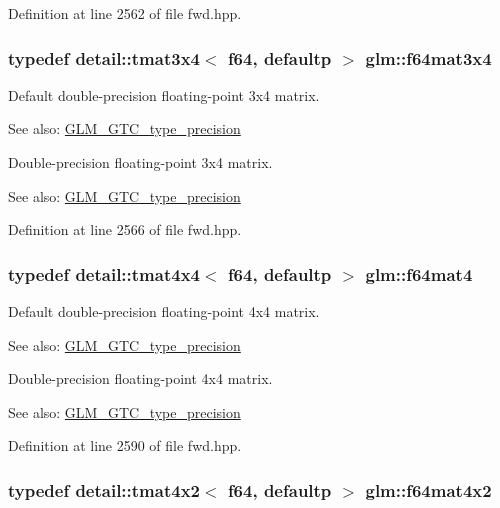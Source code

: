 Definition at line 2562 of file fwd.hpp.\hypertarget{group__gtc__type__precision_gc9468e5fa519d06b452d3126bb22a597}{
\subsubsection[f64mat3x4]{\setlength{\rightskip}{0pt plus 5cm}typedef detail::tmat3x4$<$ f64, defaultp $>$ {\bf glm::f64mat3x4}}}
\label{group__gtc__type__precision_gc9468e5fa519d06b452d3126bb22a597}


Default double-precision floating-point 3x4 matrix. \begin{Desc}
\item[See also:]\hyperlink{group__gtc__type__precision}{GLM\_\-GTC\_\-type\_\-precision}\end{Desc}
Double-precision floating-point 3x4 matrix. \begin{Desc}
\item[See also:]\hyperlink{group__gtc__type__precision}{GLM\_\-GTC\_\-type\_\-precision} \end{Desc}


Definition at line 2566 of file fwd.hpp.\hypertarget{group__gtc__type__precision_g1e2d73ea989e6a5abd90cbe9f1025a41}{
\subsubsection[f64mat4]{\setlength{\rightskip}{0pt plus 5cm}typedef detail::tmat4x4$<$ f64, defaultp $>$ {\bf glm::f64mat4}}}
\label{group__gtc__type__precision_g1e2d73ea989e6a5abd90cbe9f1025a41}


Default double-precision floating-point 4x4 matrix. \begin{Desc}
\item[See also:]\hyperlink{group__gtc__type__precision}{GLM\_\-GTC\_\-type\_\-precision}\end{Desc}
Double-precision floating-point 4x4 matrix. \begin{Desc}
\item[See also:]\hyperlink{group__gtc__type__precision}{GLM\_\-GTC\_\-type\_\-precision} \end{Desc}


Definition at line 2590 of file fwd.hpp.\hypertarget{group__gtc__type__precision_ge716a8717cc6af191aec562d93ff6299}{
\subsubsection[f64mat4x2]{\setlength{\rightskip}{0pt plus 5cm}typedef detail::tmat4x2$<$ f64, defaultp $>$ {\bf glm::f64mat4x2}}}
\label{group__gtc__type__precision_ge716a8717cc6af191aec562d93ff6299}


